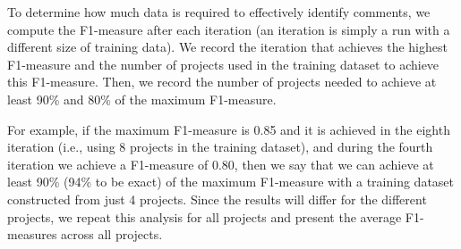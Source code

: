 

To determine how much data is required to effectively identify \SATD comments, we compute the F1-measure after each iteration (an iteration is simply a run with a different size of training data). We record the iteration that achieves the highest F1-measure and the number of projects used in the training dataset to achieve this F1-measure. Then, we record the number of projects needed to achieve at least 90\% and 80\% of the maximum F1-measure.

For example, if the maximum F1-measure is 0.85 and it is achieved in the eighth iteration (i.e., using 8 projects in the training dataset), and during the fourth iteration we achieve a F1-measure of 0.80, then we say that we can achieve at least 90\% (94\% to be exact) of the maximum F1-measure with a training dataset constructed from just 4 projects. Since the results will differ for the different projects, we repeat this analysis for all projects and present the average F1-measures across all projects.

%

